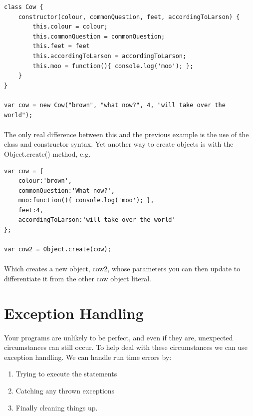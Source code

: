 \begin{lstlisting}
class Cow {
	constructor(colour, commonQuestion, feet, accordingToLarson) {
		this.colour = colour;
		this.commonQuestion = commonQuestion;
		this.feet = feet
		this.accordingToLarson = accordingToLarson;
		this.moo = function(){ console.log('moo'); };
	}
}

var cow = new Cow("brown", "what now?", 4, "will take over the world");
\end{lstlisting}

\paragraph{} The only real difference between this and the previous example is the use of the class and constructor syntax. Yet another way to create objects is with the Object.create() method, e.g.

\begin{lstlisting}
var cow = {
  	colour:'brown',
  	commonQuestion:'What now?',
  	moo:function(){ console.log('moo'); },
  	feet:4,
  	accordingToLarson:'will take over the world'
};

var cow2 = Object.create(cow);
\end{lstlisting}

\paragraph{} Which creates a new object, cow2, whose parameters you can then update to differentiate it from the other cow object literal.



\section{Exception Handling}
\paragraph{} Your programs are unlikely to be perfect, and even if they are, unexpected circumstances can still occur. To help deal with these circumstances we can use exception handling.
We can handle run time errors by:

\begin{enumerate}
\item Trying to execute the statements
\item Catching any thrown exceptions
\item Finally cleaning things up.
\end{enumerate}


